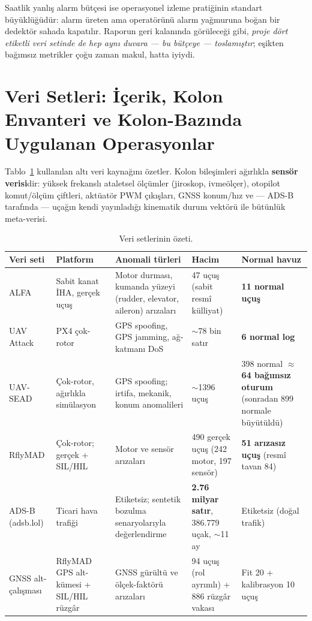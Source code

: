 \documentclass[11pt,a4paper]{article}
\begin{document}
Saatlik yanlış alarm bütçesi ise operasyonel izleme pratiğinin standart
büyüklüğüdür: alarm üreten ama operatörünü alarm yağmuruna boğan bir dedektör
sahada kapatılır. Raporun geri kalanında görüleceği gibi, \emph{proje dört
etiketli veri setinde de hep aynı duvara --- bu bütçeye --- toslamıştır};
eşikten bağımsız metrikler çoğu zaman makul, hatta iyiydi.

\section{Veri Setleri: İçerik, Kolon Envanteri ve Kolon-Bazında Uygulanan
Operasyonlar}
\label{sec:veri}

Tablo~\ref{tab:veri-ozet} kullanılan altı veri kaynağını özetler. Kolon
bileşimleri ağırlıkla \textbf{sensör verisi}dir: yüksek frekanslı ataletsel
ölçümler (jiroskop, ivmeölçer), otopilot komut/ölçüm çiftleri, aktüatör PWM
çıkışları, GNSS konum/hız ve --- ADS-B tarafında --- uçağın kendi yayınladığı
kinematik durum vektörü ile bütünlük meta-verisi.

\begin{table}[h]
\centering\small
\caption{Veri setlerinin özeti.}
\label{tab:veri-ozet}
\begin{tabular}{p{2.4cm}p{2.6cm}p{3.4cm}p{2.9cm}p{3.2cm}}
\toprule
Veri seti & Platform & Anomali türleri & Hacim & Normal havuz \\
\midrule
ALFA \cite{keipour2021alfa} & Sabit kanat İHA, gerçek uçuş & Motor durması,
kumanda yüzeyi (rudder, elevator, aileron) arızaları & 47 uçuş (sabit resmî
külliyat) & \textbf{11 normal uçuş} \\
\addlinespace[2pt]
UAV Attack \cite{whelan2020uav} & PX4 çok-rotor & GPS spoofing, GPS jamming,
ağ-katmanı DoS & $\sim$78 bin satır & \textbf{6 normal log} \\
\addlinespace[2pt]
UAV-SEAD & Çok-rotor, ağırlıkla simülasyon & GPS spoofing; irtifa, mekanik,
konum anomalileri & $\sim$1396 uçuş & 398 normal $\approx$ \textbf{64 bağımsız
oturum} (sonradan 899 normale büyütüldü) \\
\addlinespace[2pt]
RflyMAD \cite{rflymad} & Çok-rotor; gerçek + SIL/HIL & Motor ve sensör
arızaları & 490 gerçek uçuş (242 motor, 197 sensör) & \textbf{51 arızasız uçuş}
(resmî tavan 84) \\
\addlinespace[2pt]
ADS-B (adsb.lol) \cite{adsblol} & Ticari hava trafiği & Etiketsiz; sentetik
bozulma senaryolarıyla değerlendirme & \textbf{2.76 milyar satır}, 386.779
uçak, $\sim$11 ay & Etiketsiz (doğal trafik) \\
\addlinespace[2pt]
GNSS alt-çalışması & RflyMAD GPS alt-kümesi + SIL/HIL rüzgâr & GNSS gürültü ve
ölçek-faktörü arızaları & 94 uçuş (rol ayrımlı) + 886 rüzgâr vakası & Fit 20 +
kalibrasyon 10 uçuş \\
\bottomrule
\end{tabular}
\end{table}
\end{document}
